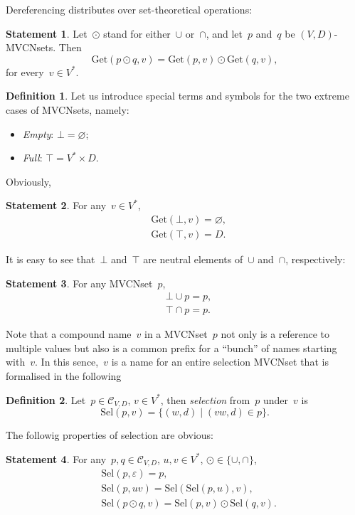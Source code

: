 \documentclass{article}
\theoremstyle{definition}
\newtheorem{Df}{Definition}
\newtheorem{St}{Statement}
\newcommand{\setcharmvcn}{C}
\newcommand{\setsymbol}[3]{\mathcal{#1}_{#2,#3}}
\newcommand{\setmvcn}[2]{\setsymbol{\setcharmvcn}{#1}{#2}}
\newcommand{\select}{\mathrm{Sel}}
\newcommand{\deref}[2]{\mathrm{Get}(#1, #2)}
\begin{document}
Dereferencing distributes over set-theoretical operations:
\begin{St}\label{st:mvcn-deref-distributivity}
Let~$\odot$ stand for either~$\cup$ or~$\cap$, and let~$p$ and~$q$ be
$(V,D)$-MVCNsets. Then
\[
  \deref{p\odot q}{v} = \deref{p}{v} \odot \deref{q}{v} ,
\]
for every~$v\in V^\ast$.
\end{St}

\begin{Df}\label{df:mvcn-extremes}
Let us introduce special terms and symbols for the two extreme cases of
MVCNsets, namely:
\begin{itemize}
\item \emph{Empty}: $\bot = \varnothing$;
\item \emph{Full}: $\top = V^\ast \times D$.
\end{itemize}
\end{Df}
Obviously,
\begin{St}\label{st:mvcn-extreme-deref}
For any~$v\in V^\ast$,
\begin{eqnarray*}
  & \deref{\bot}{v} = \varnothing, \\
  & \deref{\top}{v} = D .
\end{eqnarray*}
\end{St}
It is easy to see that~$\bot$ and~$\top$ are neutral elements
of~$\cup$ and~$\cap$, respectively:
\begin{St}\label{st:mvcn-neutrals}
For any MVCNset~$p$,
\begin{eqnarray*}
  & \bot \cup p = p, \\
  & \top \cap p = p .
\end{eqnarray*}
\end{St}

Note that a compound name~$v$ in a MVCNset~$p$ not only is a reference to
multiple values but also is a common prefix for a ``bunch'' of names starting
with~$v$. In this sence,~$v$ is a name for an entire selection MVCNset that is
formalised in the following
\begin{Df}\label{df:mvcn-select}
Let~$p\in\setmvcn{V}{D}$, $v\in V^\ast$, then \emph{selection} from~$p$
under~$v$ is
\[
  \select(p,v) = \{ (w, d) \mid (vw, d)\in p \} .
\]
\end{Df}

The followig properties of selection are obvious:
\begin{St}\label{st:mvcn-selection-properties}
For any~$p,q\in\setmvcn{V}{D}$, $u, v\in V^\ast$, $\odot\in\{\cup, \cap\}$,
\begin{eqnarray*}
  & \select(p,\varepsilon) = p, \\
  & \select(p,uv) = \select(\select(p,u), v), \\
  & \select(p\odot q, v) = \select(p,v)\odot \select(q,v).
\end{eqnarray*}
\end{St}
\end{document}
